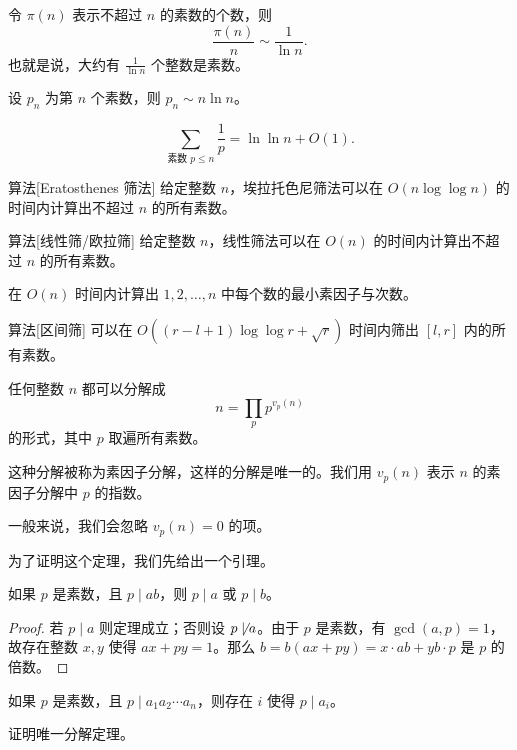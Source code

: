 \begin{theorem}[素数定理]
    令 $\pi(n)$ 表示不超过 $n$ 的素数的个数，则
    $$
    \frac{\pi(n)}{n}\sim \frac{1}{\ln n}.
    $$
    也就是说，大约有 $\frac{1}{\ln n}$ 个整数是素数。
\end{theorem}
\begin{corollary}
    设 $p_n$ 为第 $n$ 个素数，则 $p_n\sim n\ln n$。

    $$
    \sum_{\text{素数 } p\le n}\frac{1}{p}=\ln\ln n+O(1).
    $$
\end{corollary}

\begin{descbox}{算法}[Eratosthenes 筛法]
    给定整数 $n$，埃拉托色尼筛法可以在 $O(n\log\log n)$ 的时间内计算出不超过 $n$ 的所有素数。
\end{descbox}

\begin{descbox}{算法}[线性筛/欧拉筛]
    给定整数 $n$，线性筛法可以在 $O(n)$ 的时间内计算出不超过 $n$ 的所有素数。
\end{descbox}
\begin{exercise}
    在 $O(n)$ 时间内计算出 $1,2,\ldots,n$ 中每个数的最小素因子与次数。
\end{exercise}

\begin{descbox}{算法}[区间筛]
    可以在 $O((r-l+1)\log\log r+\sqrt{r})$ 时间内筛出 $[l,r]$ 内的所有素数。
\end{descbox}

\begin{theorem}
    任何整数 $n$ 都可以分解成 
    $$
    n=\prod_p p^{v_p(n)}
    $$
    的形式，其中 $p$ 取遍所有素数。
    
    这种分解被称为素因子分解，这样的分解是唯一的。我们用 $v_p(n)$ 表示 $n$ 的素因子分解中 $p$ 的指数。
\end{theorem}
\begin{remark}
    一般来说，我们会忽略 $v_p(n)=0$ 的项。
\end{remark}
为了证明这个定理，我们先给出一个引理。
\begin{lemma}[Euclid 引理]
    如果 $p$ 是素数，且 $p\mid ab$，则 $p\mid a$ 或 $p\mid b$。
\end{lemma}
\begin{proof}
    若 $p\mid a$ 则定理成立；否则设 $p\not\mid a$。由于 $p$ 是素数，有 $\gcd(a,p)=1$，故存在整数 $x,y$ 使得 $ax+py=1$。那么 $b=b(ax+py)=x\cdot ab+yb\cdot p$ 是 $p$ 的倍数。
\end{proof}
\begin{corollary}
    如果 $p$ 是素数，且 $p\mid a_1a_2\cdots a_n$，则存在 $i$ 使得 $p\mid a_i$。
\end{corollary}
\begin{exercise}
    证明唯一分解定理。
\end{exercise}


